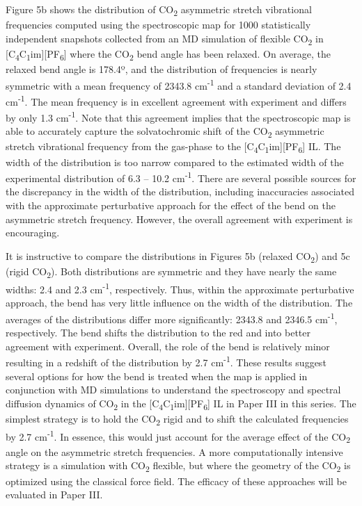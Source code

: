 \documentclass[]{article}
\begin{document}
Figure 5b shows the distribution of CO\textsubscript{2} asymmetric stretch vibrational frequencies computed using the spectroscopic map for 1000 statistically independent snapshots collected from an MD simulation of flexible CO\textsubscript{2} in {[}C\textsubscript{4}C\textsubscript{1}im{]}{[}PF\textsubscript{6}{]} where the CO\textsubscript{2} bend angle has been relaxed. On average, the relaxed bend angle is 178.4º, and the distribution of frequencies is nearly symmetric with a mean frequency of 2343.8 cm\textsuperscript{-1} and a standard deviation of 2.4 cm\textsuperscript{-1}. The mean frequency is in excellent agreement with experiment and differs by only 1.3 cm\textsuperscript{-1}. Note that this agreement implies that the spectroscopic map is able to accurately capture the solvatochromic shift of the CO\textsubscript{2} asymmetric stretch vibrational frequency from the gas-phase to the {[}C\textsubscript{4}C\textsubscript{1}im{]}{[}PF\textsubscript{6}{]} IL. The width of the distribution is too narrow compared to the estimated width of the experimental distribution of 6.3 -- 10.2 cm\textsuperscript{-1}. There are several possible sources for the discrepancy in the width of the distribution, including inaccuracies associated with the approximate perturbative approach for the effect of the bend on the asymmetric stretch frequency. However, the overall agreement with experiment is encouraging.

It is instructive to compare the distributions in Figures 5b (relaxed CO\textsubscript{2}) and 5c (rigid CO\textsubscript{2}). Both distributions are symmetric and they have nearly the same widths: 2.4 and 2.3 cm\textsuperscript{-1}, respectively. Thus, within the approximate perturbative approach, the bend has very little influence on the width of the distribution. The averages of the distributions differ more significantly: 2343.8 and 2346.5 cm\textsuperscript{-1}, respectively. The bend shifts the distribution to the red and into better agreement with experiment. Overall, the role of the bend is relatively minor resulting in a redshift of the distribution by 2.7 cm\textsuperscript{-1}. These results suggest several options for how the bend is treated when the map is applied in conjunction with MD simulations to understand the spectroscopy and spectral diffusion dynamics of CO\textsubscript{2} in the {[}C\textsubscript{4}C\textsubscript{1}im{]}{[}PF\textsubscript{6}{]} IL in Paper III in this series. The simplest strategy is to hold the CO\textsubscript{2} rigid and to shift the calculated frequencies by 2.7 cm\textsuperscript{-1}. In essence, this would just account for the average effect of the CO\textsubscript{2} angle on the asymmetric stretch frequencies. A more computationally intensive strategy is a simulation with CO\textsubscript{2} flexible, but where the geometry of the CO\textsubscript{2} is optimized using the classical force field.  The efficacy of these approaches will be evaluated in Paper III.
\end{document}
